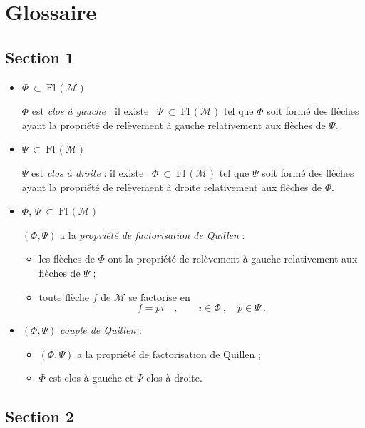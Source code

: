 \documentclass[11pt]{article}
\newcommand{\printedpage}[1]{\marginpar{\footnotesize p.~#1}}
\newcommand{\Fl}{\mathrm{Fl}\,}
\renewcommand{\thefootnote}{\arabic{footnote}}
\begin{document}
\clearpage

\printedpage{58}

\setcounter{footnote}{0}
\renewcommand{\thefootnote}{\fnsymbol{footnote}}
\section*{Glossaire}

\subsection*{Section 1}

\begin{itemize}
\item $\Phi \ \subset\ \Fl(\mathcal{M})$

$\Phi$ est \textit{clos à gauche} : il existe \ $\Psi \ \subset\ \Fl(\mathcal{M})$ tel que $\Phi$ soit formé des flèches ayant la propriété de relèvement à gauche relativement aux flèches de $\Psi$.

\item $\Psi \ \subset\ \Fl(\mathcal{M})$

$\Psi$ est \textit{clos à droite} : il existe \ $\Phi \ \subset\ \Fl(\mathcal{M})$ tel que $\Psi$ soit formé des flèches ayant la propriété de relèvement à droite relativement aux flèches de $\Phi$.

\item $\Phi$, $\Psi \ \subset\ \Fl(\mathcal{M})$

$(\Phi, \Psi)$ a la \textit{propriété de factorisation de Quillen} :
\begin{itemize}
\item[a)] les flèches de $\Phi$ ont la propriété de relèvement à gauche relativement aux flèches de $\Psi$ ;
\item[b)] toute flèche $f$ de $\mathcal{M}$ se factorise en
\[
f = pi \quad , \qquad i \in \Phi \ , \quad p \in \Psi \ .
\]
\end{itemize}

\item $(\Phi, \Psi)$ \textit{couple de Quillen} :
\begin{itemize}
\item[a)] $(\Phi, \Psi)$ a la propriété de factorisation de Quillen ;
\item[b)] $\Phi$ est clos à gauche et $\Psi$ clos à droite.
\end{itemize}
\end{itemize}

\subsection*{Section 2}
\end{document}
